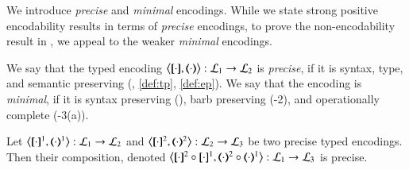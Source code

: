 \documentclass[runningheads]{llncs}
\begin{document}
{%
%
%

We introduce 
\emph{precise} and \emph{minimal}
 encodings.
While we state strong positive encodability results %
in terms of {\em precise} encodings,
to prove the non-encodability result in , 
we appeal to the weaker {\em minimal} encodings.  

\begin{definition}%
\label{def:goodenc}
We say that 
	the typed encoding 
	$\enco{\map{\cdot}, \mapt{\cdot} %
	}: \tyl{L}_1 \to \tyl{L}_2$ is 
	\emph{precise}, if it is syntax, type, and semantic preserving (, \ref{def:tp}, \ref{def:ep}).
	We say that the encoding is
	\emph{minimal}, if it is syntax preserving 
	(),
	barb preserving (-2), 
	and operationally complete (-3(a)).
\end{definition}




\begin{proposition}%
	\label{pro:composition}
	Let %
	$\enco{\map{\cdot}^{1}, \mapt{\cdot}^{1}%
	}: \tyl{L}_1 \to \tyl{L}_2$
	and 
	$\enco{\map{\cdot}^{2}, \mapt{\cdot}^{2}%
	}: \tyl{L}_2 \to \tyl{L}_3$
	be two precise typed encodings.
	Then their composition, denoted 
	$\enco{\map{\cdot}^{2} \circ \map{\cdot}^{1}, \mapt{\cdot}^{2} \circ \mapt{\cdot}^{1} %
	}: \tyl{L}_1 \to \tyl{L}_3$
	is precise. 
\end{proposition}

}
\end{document}
